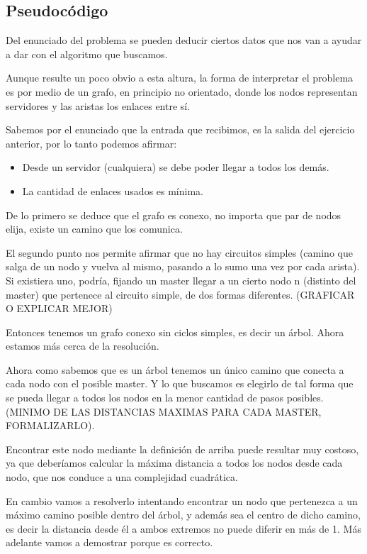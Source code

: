 \subsection{Pseudocódigo}

Del enunciado del problema se pueden deducir ciertos datos que nos van a ayudar a dar con el algoritmo que buscamos.

Aunque resulte un poco obvio a esta altura, la forma de interpretar el problema es por medio de un grafo, en principio no orientado, donde los nodos representan servidores y las aristas los enlaces entre sí.

Sabemos por el enunciado que la entrada que recibimos, es la salida del ejercicio anterior, por lo tanto podemos afirmar:

\begin{itemize}
\item Desde un servidor (cualquiera) se debe poder llegar a todos los demás.
\item La cantidad de enlaces usados es mínima.
\end{itemize}

De lo primero se deduce que el grafo es conexo, no importa que par de nodos elija, existe un camino que los comunica.

El segundo punto nos permite afirmar que no hay circuitos simples (camino que salga de un nodo y vuelva al mismo, pasando a lo sumo una vez por cada arista). Si existiera uno, podría, fijando un master llegar a un cierto nodo n (distinto del master) que pertenece al circuito simple, de dos formas diferentes. (GRAFICAR O EXPLICAR MEJOR)

Entonces tenemos un grafo conexo sin ciclos simples, es decir un árbol. Ahora estamos más cerca de la resolución.

Ahora como sabemos que es un árbol tenemos un único camino que conecta a cada nodo con el posible master. Y lo que buscamos es elegirlo de tal forma que se pueda llegar a todos los nodos en la menor cantidad de pasos posibles. (MINIMO DE LAS DISTANCIAS MAXIMAS PARA CADA MASTER, FORMALIZARLO).

Encontrar este nodo mediante la definición de arriba puede resultar muy costoso, ya que deberíamos calcular la máxima distancia a todos los nodos desde cada nodo, que nos conduce a una complejidad cuadrática.

En cambio vamos a resolverlo intentando encontrar un nodo que pertenezca a un máximo camino posible dentro del árbol, y además sea el centro de dicho camino, es decir la distancia desde él a ambos extremos no puede diferir en más de 1. Más adelante vamos a demostrar porque es correcto.

